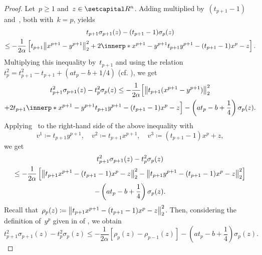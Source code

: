 \documentclass[../main]{subfiles}
\begin{document}
\begin{proof}
    Let~$p \ge 1$ and~$z \in \setR^n$.
    Adding  multiplied by~$(t_{p + 1} - 1)$ and~, both with~$k = p$, yields
    \begin{multline}
        t_{p + 1} \sigma_{p + 1}(z) - (t_{p + 1} - 1) \sigma_p(z) \\
        \le - \frac{1}{2 \alpha} \left[ t_{p + 1} \norm*{x^{p + 1} - y^{p + 1}}_2^2 + 2 \innerp*{x^{p + 1} - y^{p + 1}}{t_{p + 1} y^{p + 1} - (t_{p + 1} - 1)x^p - z} \right]
        .\end{multline}
    Multiplying this inequality by~$t_{p + 1}$ and using the relation~$t_p^2 = t_{p + 1}^2 - t_{p + 1} + (a t_p - b + 1/4)$ (cf. ), we get
    \begin{multline}
        t_{p + 1}^2 \sigma_{p + 1}(z) - t_p^2 \sigma_p(z) \le - \frac{1}{2 \alpha} \Bigl[ \norm*{t_{p + 1} (x^{p + 1} - y^{p + 1})}_2^2  \\
            + 2 t_{p + 1} \innerp*{x^{p + 1} - y^{p + 1}}{t_{p + 1} y^{p + 1} - (t_{p + 1} - 1)x^p - z} \Bigr] - \left( a t_p - b + \frac{1}{4} \right) \sigma_p(z)
        .\end{multline}
    Applying~ to the right-hand side of the above inequality with
    \begin{equation}
        v^1 \coloneqq t_{p + 1} y^{p + 1}, \quad v^2 \coloneqq t_{p + 1} x^{p + 1}, \quad v^3 \coloneqq (t_{p + 1} - 1) x^p + z
        ,\end{equation}
    we get
    \begin{multline}
        t_{p + 1}^2 \sigma_{p + 1}(z) - t_p^2 \sigma_p(z) \\
        \le - \frac{1}{2 \alpha} \left[ \norm*{t_{p + 1} x^{p + 1} - (t_{p + 1} - 1) x^p - z}_2^2 - \norm*{t_{p + 1} y^{p + 1} - (t_{p + 1} - 1) x^p - z}_2^2 \right] \\
        - \left( a t_p - b + \frac{1}{4} \right) \sigma_p(z)
        .\end{multline}
    Recall that~$\rho_p(z) \coloneqq \norm*{t_{p + 1} x^{p + 1} - (t_{p + 1} - 1) x^p - z}_2^2$.
    Then, considering the definition of~$y^p$ given in  of , we obtain
    \begin{equation}
        t_{p + 1}^2 \sigma_{p + 1}(z) - t_p^2 \sigma_p(z) \le - \frac{1}{2 \alpha} \left[ \rho_p(z) - \rho_{p - 1}(z) \right] - \left( a t_p - b + \frac{1}{4} \right) \sigma_p(z)
        .\end{equation}

\end{proof}
\end{document}
